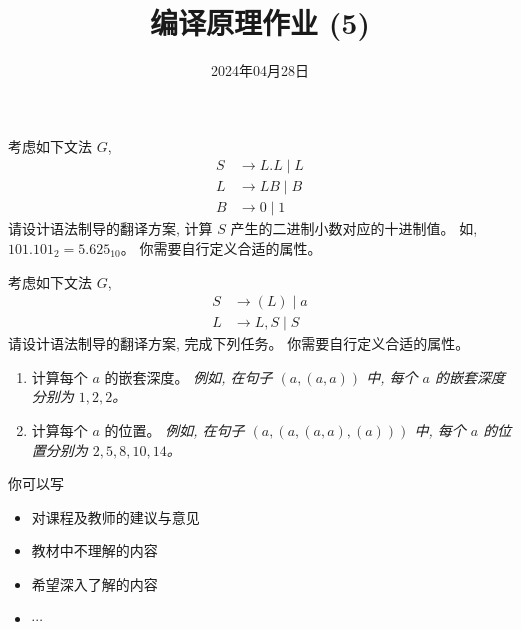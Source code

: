 \documentclass[a4paper, justified]{tufte-handout}
\title{编译原理作业 (5)}
\date{2024年04月28日}
\begin{document}
\maketitle
\noplagiarism %
\begin{abstract}
\end{abstract}
\beginrequired

\begin{problem}
  考虑如下文法 $G$,
  \begin{align*}
    S &\to L.L \mid L \\
    L &\to LB \mid B \\
    B &\to 0 \mid 1
  \end{align*}
  请设计语法制导的翻译方案, 计算 $S$ 产生的二进制小数对应的十进制值。
  如, $101.101_{2} = 5.625_{10}$。
  你需要自行定义合适的属性。
\end{problem}

\begin{solution}
\end{solution}


\begin{problem}
  考虑如下文法 $G$,
  \begin{align*}
    S &\to (L) \mid a \\
    L &\to L, S \mid S
  \end{align*}
  请设计语法制导的翻译方案, 完成下列任务。
  你需要自行定义合适的属性。
  \begin{enumerate}[(1)]
    \item 计算每个 $a$ 的嵌套深度。
      {\it 例如, 在句子 $(a, (a, a))$ 中, 每个 $a$ 的嵌套深度分别为 $1, 2, 2$。}
    \item 计算每个 $a$ 的位置。
      {\it 例如, 在句子 $(a, (a, (a, a), (a)))$ 中, 每个 $a$ 的位置分别为
        $2, 5, 8, 10, 14$。}
  \end{enumerate}
\end{problem}

\begin{solution}
\end{solution}



\beginfb

你可以写
\begin{itemize}
  \item 对课程及教师的建议与意见
  \item 教材中不理解的内容
  \item 希望深入了解的内容
  \item $\cdots$
\end{itemize}
\end{document}
